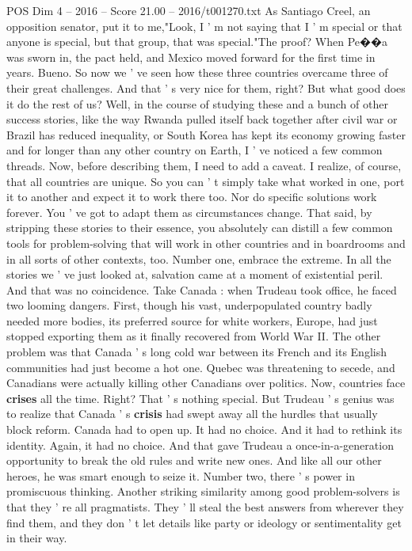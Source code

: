 \begin{textsample}{POS Dim 4 – 2016 – Score 21.00 – 2016/t001270.txt}
As Santiago Creel, an opposition senator, put it to me,"Look, I ' m not saying that I ' m special or that anyone is special, but that group, that was special."The proof?
When Pe{\EmojiFont �}{\EmojiFont �}a was sworn in, the pact held, and Mexico moved forward for the first time in years.
Bueno.
So now we ' ve seen how these three countries overcame three of their great challenges.
And that ' s very nice for them, right?
But what good does it do the rest of us?
Well, in the course of studying these and a bunch of other success stories, like the way Rwanda pulled itself back together after civil war or Brazil has reduced inequality, or South Korea has kept its economy growing faster and for longer than any other country on Earth, I ' ve noticed a few common threads.
Now, before describing them, I need to add a caveat.
I realize, of course, that all countries are unique.
So you can ' t simply take what worked in one, port it to another and expect it to work there too.
Nor do specific solutions work forever.
You ' ve got to adapt them as circumstances change.
That said, by stripping these stories to their essence, you absolutely can distill a few common tools for problem-solving that will work in other countries and in boardrooms and in all sorts of other contexts, too.
Number one, embrace the extreme.
In all the stories we ' ve just looked at, salvation came at a moment of existential peril.
And that was no coincidence.
Take Canada : when Trudeau took office, he faced two looming dangers.
First, though his vast, underpopulated country badly needed more bodies, its preferred source for white workers, Europe, had just stopped exporting them as it finally recovered from World War II.
The other problem was that Canada ' s long cold war between its French and its English communities had just become a hot one.
Quebec was threatening to secede, and Canadians were actually killing other Canadians over politics.
Now, countries face \textbf{crises} all the time.
Right?
That ' s nothing special.
But Trudeau ' s genius was to realize that Canada ' s \textbf{crisis} had swept away all the hurdles that usually block reform.
Canada had to open up.
It had no choice.
And it had to rethink its identity.
Again, it had no choice.
And that gave Trudeau a once-in-a-generation opportunity to break the old rules and write new ones.
And like all our other heroes, he was smart enough to seize it.
Number two, there ' s power in promiscuous thinking.
Another striking similarity among good problem-solvers is that they ' re all pragmatists.
They ' ll steal the best answers from wherever they find them, and they don ' t let details like party or ideology or sentimentality get in their way.

\end{textsample}
